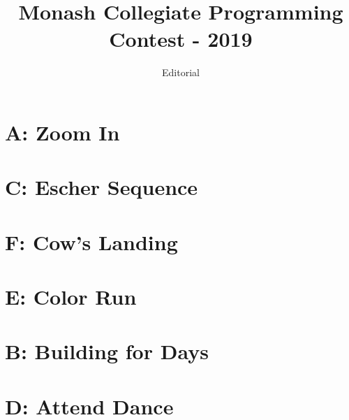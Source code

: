 \documentclass{beamer}
\title[MCPC-2019]{Monash Collegiate Programming Contest - 2019}
\subtitle{Editorial}
\date{}
\author[Eggeek (Shizhe Zhao)]{
}
\begin{document}

\frame{\titlepage}
\section[]{}

\section{A: Zoom In}


\section{C: Escher Sequence}


\section{F: Cow's Landing}


\section{E: Color Run}


\section{B: Building for Days}


\section{D: Attend Dance}


\end{document}
